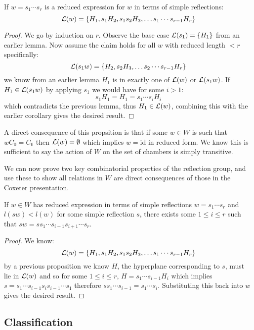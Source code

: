 \documentclass[../main.tex]{subfiles}
\begin{document}
\begin{proposition}
    If $w=s_1\cdots s_r$ is a reduced expression for $w$ in terms of simple reflections: \[
        \mathcal{L}(w) = \{H_1, s_1 H_2, s_1s_2H_3,\ldots s_1\cdots s_{r-1} H_r\}
    \]
    \begin{proof}
        We go by induction on $r$. Observe the base case $\mathcal{L}(s_1) = \{H_1\}$ from an earlier lemma. Now assume the claim holds for all $w$ with reduced length $<r$ specifically:\[
            \mathcal{L}(s_1w) = \{H_2, s_2H_3,\ldots s_2\cdots s_{r-1} H_r\}
        \] we know from an earlier lemma $H_1$ is in exactly one of $\mathcal{L}(w)$ or $\mathcal{L}(s_1w)$. If $H_1\in \mathcal{L}(s_1w)$ by applying $s_1$ we would have for some $i>1$: \[
            s_1H_1 = H_1 = s_1\cdots s_i H_i
        \] which contradicts the previous lemma, thus $H_1\in \mathcal{L}(w)$, combining this with the earlier corollary gives the desired result.
    \end{proof}
\end{proposition}

A direct consequence of this propsition is that if some $w\in W$ is such that $wC_0 = C_0$ then $\mathcal{L}(w)=\emptyset$ which implies $w=\text{id}$ in reduced form. We know this is sufficient to say the action of $W$ on the set of chambers is simply transitive.

We can now prove two key combinatorial properties of the reflection group, and use these to show all relations in $W$ are direct consequences of those in the Coxeter presentation.

\begin{theorem}
    If $w\in W$ has reduced expression in terms of simple reflections $w=s_1\cdots s_r$ and $l(sw)<l(w)$ for some simple reflection $s$, there exists some $1\leq i\leq r$ such that $sw = ss_1\cdots s_{i-1}s_{i+1}\cdots s_r$.
    \begin{proof}
        We know:\[
            \mathcal{L}(w) = \{H_1, s_1 H_2, s_1s_2H_3,\ldots s_1\cdots s_{r-1} H_r\}
        \] by a previous proposition we know $H$, the hyperplane corresponding to $s$, must lie in $\mathcal{L}(w)$ and so for some $1\leq i \leq r$, $H=s_1\cdots s_{i-1} H_i$ which implies $s=s_1\cdots s_{i-1} s_i s_{i-1}\cdots s_1$ therefore $ss_1\cdots s_{i-1} = s_1\cdots s_i$. Substituting this back into $w$ gives the desired result.
    \end{proof}
\end{theorem}

\subsection{Classification}
\end{document}
